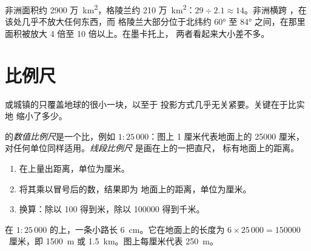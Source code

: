 \begin{example}[格陵兰与非洲]
非洲面积约 2900 万~\unit{km^2}，格陵兰约
210 万~\unit{km^2}：$29 \div 2.1 \approx 14$。非洲横跨
，在该处几乎不放大任何东西，而
格陵兰大部分位于北纬约 \ang{60} 至 \ang{84} 之间，在那里
面积被放大 4 倍至 10 倍以上。在墨卡托上，
两者看起来大小差不多。
\end{example}

\section{比例尺}

或城镇的只覆盖地球的很小一块，以至于
投影方式几乎无关紧要。关键在于比实地
缩小了多少。

\begin{definition}[数值比例尺与线段比例尺]\label{def:g9:maps-of-the-earth:numerical-scale}
的\emph{数值比例尺}是一个比，例如
$1 : 25\,000$：图上 1 厘米代表地面上的 \num{25000} 厘米，
对任何单位同样适用。\emph{线段比例尺}
是画在上的一把直尺，
标有地面上的距离。
\end{definition}

\begin{method}[使用数值比例尺]
\begin{enumerate}
  \item 在上量出距离，单位为厘米。
  \item 将其乘以冒号后的数，结果即为
        地面上的距离，单位为厘米。
  \item 换算：除以 100 得到米，除以 \num{100000} 得到千米。
\end{enumerate}
\end{method}

\begin{example}[$1 : 25\,000$ 地图上的步行]
在 $1 : 25\,000$ 的上，一条小路长 \qty{6}{cm}。它在地面上的长度为
$6 \times 25\,000 = \num{150000}$~厘米，即 \qty{1500}{m} 或
\qty{1.5}{km}。图上每厘米代表 \qty{250}{m}。
\end{example}

